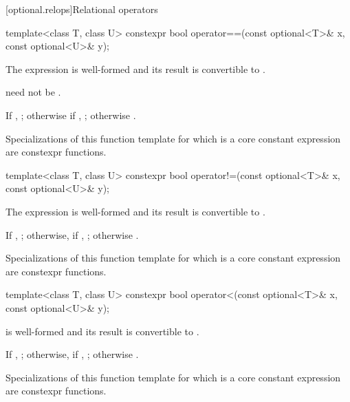 [optional.relops]{Relational operators}

%
\begin{itemdecl}
template<class T, class U> constexpr bool operator==(const optional<T>& x, const optional<U>& y);
\end{itemdecl}

\begin{itemdescr}
\pnum
\mandates
The expression  is well-formed and
its result is convertible to .
\begin{note}
 need not be .
\end{note}

\pnum
\returns
If , ; otherwise if , ; otherwise .

\pnum
\remarks
Specializations of this function template
for which  is a core constant expression
are constexpr functions.
\end{itemdescr}

%
\begin{itemdecl}
template<class T, class U> constexpr bool operator!=(const optional<T>& x, const optional<U>& y);
\end{itemdecl}

\begin{itemdescr}
\pnum
\mandates
The expression  is well-formed and
its result is convertible to .

\pnum
\returns
If , ;
otherwise, if , ;
otherwise .

\pnum
\remarks
Specializations of this function template
for which  is a core constant expression
are constexpr functions.
\end{itemdescr}

%
\begin{itemdecl}
template<class T, class U> constexpr bool operator<(const optional<T>& x, const optional<U>& y);
\end{itemdecl}

\begin{itemdescr}
\pnum
\mandates
{} is well-formed
and its result is convertible to .

\pnum
\returns
If , ;
otherwise, if , ;
otherwise .

\pnum
\remarks
Specializations of this function template
for which  is a core constant expression
are constexpr functions.
\end{itemdescr}

